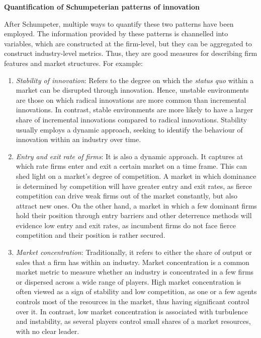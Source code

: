 \documentclass[12pt,a4paper]{article}
\begin{document}
\noindent \textbf{Quantification of Schumpeterian patterns of innovation}

After Schumpeter, multiple ways to quantify these two patterns have been employed. The information provided by these patterns is channelled into variables, which are constructed at the firm-level, but they can be aggregated to construct industry-level metrics. Thus, they are good measures for describing firm features and market structures. For example: 

\begin{enumerate}
	\item \textit{Stability of innovation}: Refers to the degree on which the \textit{status quo} within a market can be disrupted through innovation. Hence, unstable environments are those on which radical innovations are more common than incremental innovations. In contrast, stable environments are more likely to have a larger share of incremental innovations compared to radical innovations. Stability usually employs a dynamic approach, seeking to identify the behaviour of innovation within an industry over time. 
	
	\item \textit{Entry and exit rate of firms}: It is also a dynamic approach. It captures at which rate firms enter and exit a certain market on a time frame. This can shed light on a market’s degree of competition. A market in which dominance is determined by competition will have greater entry and exit rates, as fierce competition can drive weak firms out of the market constantly, but also attract new ones. On the other hand, a market in which a few dominant firms hold their position through entry barriers and other deterrence methods will evidence low entry and exit rates, as incumbent firms do not face fierce competition and their position is rather secured. 
	
	\item \textit{Market concentration}: Traditionally, it refers to either the share of output or sales that a firm has within an industry. Market concentration is a common market metric to measure whether an industry is concentrated in a few firms or dispersed across a wide range of players. High market concentration is often viewed as a sign of stability and low competition, as one or a few agents controls most of the resources in the market, thus having significant control over it. In contrast, low market concentration is associated with turbulence and instability, as several players control small shares of a market resources, with no clear leader.  
	

\end{enumerate}
\end{document}
